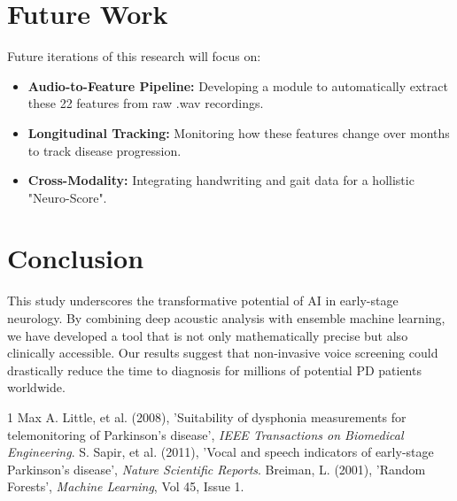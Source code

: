 \documentclass[10pt,journal,compsoc]{IEEEtran}
\begin{document}
\section{Future Work}
Future iterations of this research will focus on:
\begin{itemize}
    \item \textbf{Audio-to-Feature Pipeline:} Developing a module to automatically extract these 22 features from raw .wav recordings.
    \item \textbf{Longitudinal Tracking:} Monitoring how these features change over months to track disease progression.
    \item \textbf{Cross-Modality:} Integrating handwriting and gait data for a hollistic "Neuro-Score".
\end{itemize}

\section{Conclusion}
This study underscores the transformative potential of AI in early-stage neurology. By combining deep acoustic analysis with ensemble machine learning, we have developed a tool that is not only mathematically precise but also clinically accessible. Our results suggest that non-invasive voice screening could drastically reduce the time to diagnosis for millions of potential PD patients worldwide.

\begin{thebibliography}{1}
Max A. Little, et al. (2008), 'Suitability of dysphonia measurements for telemonitoring of Parkinson's disease', \textit{IEEE Transactions on Biomedical Engineering}.
S. Sapir, et al. (2011), 'Vocal and speech indicators of early-stage Parkinson’s disease', \textit{Nature Scientific Reports}.
Breiman, L. (2001), 'Random Forests', \textit{Machine Learning}, Vol 45, Issue 1.
\end{thebibliography}
\end{document}
